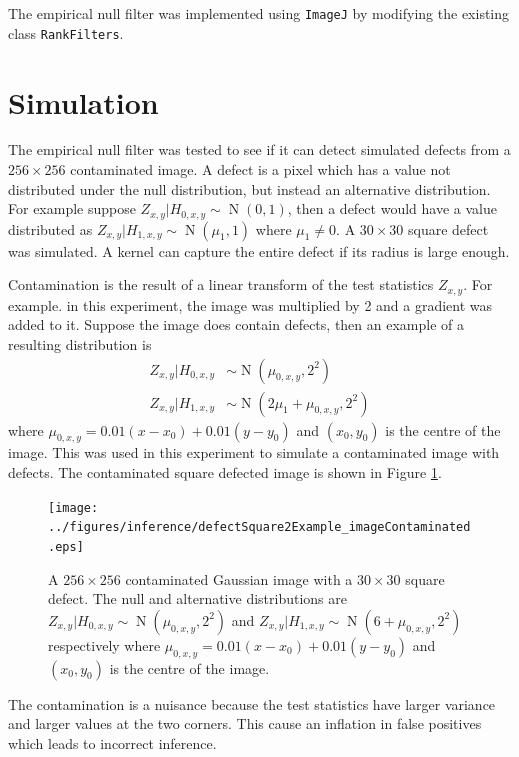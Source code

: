 \documentclass[twocolumn]{article}
\DeclareMathOperator{\normal}{N}
\begin{document}
The empirical null filter was implemented using \texttt{ImageJ} \citep{abramoff2004image, schindelin2012fiji, schneider2012nih, perez2013image} by modifying the existing class \texttt{RankFilters}.

\section{Simulation}

The empirical null filter was tested to see if it can detect simulated defects from a $256\times 256$ contaminated image. A defect is a pixel which has a value not distributed under the null distribution, but instead an alternative distribution. For example suppose $Z_{x,y}|H_{0,x,y}\sim\normal(0,1)$, then a defect would have a value distributed as $Z_{x,y}|H_{1,x,y}\sim\normal(\mu_{1},1)$ where $\mu_1\neq0$. A $30\times 30$ square defect was simulated. A kernel can capture the entire defect if its radius is large enough.

Contamination is the result of a linear transform of the test statistics $Z_{x,y}$. For example. in this experiment, the image was multiplied by 2 and a gradient was added to it. Suppose the image does contain defects, then an example of a resulting distribution is
\begin{align}
  Z_{x,y}|H_{0,x,y}&\sim\normal(\mu_{0,x,y},2^2)
  \\
  Z_{x,y}|H_{1,x,y}&\sim\normal(2\mu_1+\mu_{0,x,y},2^2)
\end{align}
where $\mu_{0,x,y}=0.01(x-x_0)+0.01(y-y_0)$ and $(x_0,y_0)$ is the centre of the image. This was used in this experiment to simulate a contaminated image with defects. The contaminated square defected image is shown in Figure \ref{fig:inference_defectSquare2Example}.

\begin{figure}
  \centering
  \texttt{[image: ../figures/inference/defectSquare2Example\_imageContaminated.eps]}
  \caption{A $256\times 256$ contaminated Gaussian image with a $30 \times 30$ square defect. The null and alternative distributions are $Z_{x,y}|H_{0,x,y}\sim\normal(\mu_{0,x,y},2^2)$ and $Z_{x,y}|H_{1,x,y}\sim\normal(6+\mu_{0,x,y},2^2)$ respectively where $\mu_{0,x,y}=0.01(x-x_0)+0.01(y-y_0)$ and $(x_0,y_0)$ is the centre of the image.}
  \label{fig:inference_defectSquare2Example}
\end{figure}

The contamination is a nuisance because the test statistics have larger variance and larger values at the two corners. This cause an inflation in false positives which leads to incorrect inference. 
\end{document}
